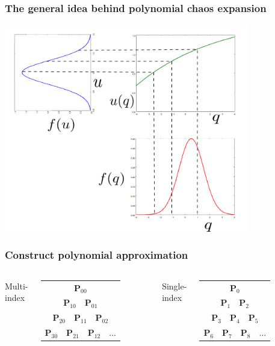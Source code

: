 \documentclass[handout]{beamer}
\begin{document}
\begin{frame}
  \frametitle{The general idea behind polynomial chaos expansion}
   \includegraphics[width=0.8\textwidth]{mapping.png}
\end{frame}



\begin{frame}
  \frametitle{Construct polynomial approximation}
  \begin{columns}[c] 
      Multi-index\\
    \begin{tabular}{c}
    \\
      $\mathbf{P}_{00}$\\
    $\mathbf{P}_{10} \quad \mathbf{P}_{01}$\\
    $\mathbf{P}_{20} \quad \mathbf{P}_{11}\quad \mathbf{P}_{02}$\\
    $\mathbf{P}_{30} \quad \mathbf{P}_{21}\quad \mathbf{P}_{12}\quad ...$ 
  \end{tabular}


Single-index\\
\begin{tabular}{c}
\\
    $\mathbf{P}_{0}$\\
    $\mathbf{P}_{1} \quad \mathbf{P}_{2}$\\
    $\mathbf{P}_{3} \quad \mathbf{P}_{4}\quad \mathbf{P}_{5}$\\
    $\mathbf{P}_{6} \quad \mathbf{P}_{7}\quad \mathbf{P}_{8}\quad ...$ 
  \end{tabular}
  \end{columns}
\end{frame}
\end{document}
